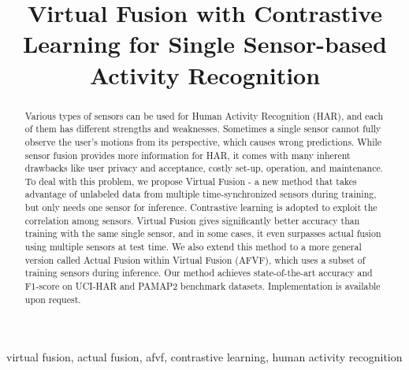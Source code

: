 \documentclass[conference]{IEEEtran}
\begin{document}
\title{Virtual Fusion with Contrastive Learning for Single Sensor-based Activity Recognition}

\author{
\and
{}
\and
{}
}

\maketitle

\begin{abstract}
Various types of sensors can be used for Human Activity Recognition (HAR), and each of them has different strengths and weaknesses. Sometimes a single sensor cannot fully observe the user's motions from its perspective, which causes wrong predictions. While sensor fusion provides more information for HAR, it comes with many inherent drawbacks like user privacy and acceptance, costly set-up, operation, and maintenance. To deal with this problem, we propose Virtual Fusion - a new method that takes advantage of unlabeled data from multiple time-synchronized sensors during training, but only needs one sensor for inference. Contrastive learning is adopted to exploit the correlation among sensors. Virtual Fusion gives significantly better accuracy than training with the same single sensor, and in some cases, it even surpasses actual fusion using multiple sensors at test time. We also extend this method to a more general version called Actual Fusion within Virtual Fusion (AFVF), which uses a subset of training sensors during inference. Our method achieves state-of-the-art accuracy and F1-score on UCI-HAR and PAMAP2 benchmark datasets. Implementation is available upon request.
\end{abstract}

\begin{IEEEkeywords}
virtual fusion, actual fusion, afvf, contrastive learning, human activity recognition
\end{IEEEkeywords}
\end{document}
